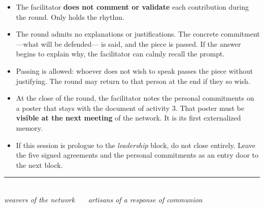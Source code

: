 \documentclass[11pt, a4paper]{article}
\begin{document}
\begin{itemize}
  \item The facilitator \textbf{does not comment or validate} each contribution during the round. Only holds the rhythm.
  \item The round admits no explanations or justifications. The concrete commitment ---what will be defended--- is said, and the piece is passed. If the answer begins to explain why, the facilitator can calmly recall the prompt.
  \item Passing is allowed: whoever does not wish to speak passes the piece without justifying. The round may return to that person at the end if they so wish.
  \item At the close of the round, the facilitator notes the personal commitments on a poster that stays with the document of activity 3. That poster must be \textbf{visible at the next meeting} of the network. It is its first externalized memory.
  \item If this session is prologue to the \emph{leadership} block, do not close entirely. Leave the five signed agreements and the personal commitments as an entry door to the next block.
\end{itemize}

\vspace{2em}

\begin{center}
{\color{regla}\rule{0.35\linewidth}{0.5pt}}\\
\vspace{0.6em}
{\color{tenue}\itshape\small weavers of the network \ \textbullet\ \ artisans of a response of communion}
\end{center}
\end{document}
